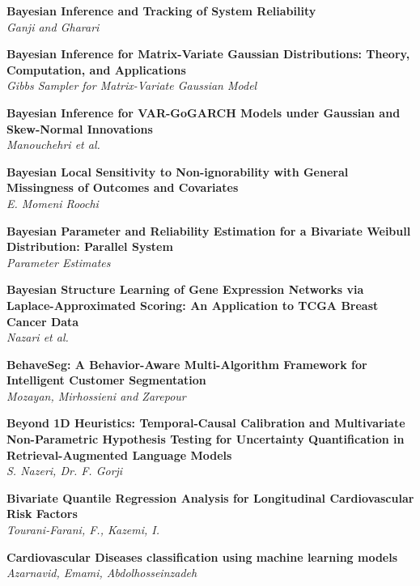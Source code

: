 \noindent
{\bf
Bayesian Inference and Tracking of System Reliability
}\dotfill \pageref{p.1119}\\
{\small \it
Ganji and Gharari
}


\noindent
{\bf
Bayesian Inference for Matrix-Variate Gaussian Distributions: Theory, Computation, and Applications
}\dotfill \pageref{p.1068}\\
{\small \it
Gibbs Sampler for Matrix-Variate Gaussian Model
}


\noindent
{\bf
Bayesian Inference for VAR-GoGARCH Models under Gaussian and Skew-Normal Innovations
}\dotfill \pageref{p.1339}\\
{\small \it
Manouchehri et al.
}


\noindent
{\bf
Bayesian Local Sensitivity to Non-ignorability with General Missingness of Outcomes and Covariates
}\dotfill \pageref{p.1161}\\
{\small \it
E. Momeni Roochi
}


\noindent
{\bf
Bayesian Parameter and Reliability Estimation for a Bivariate Weibull Distribution: Parallel System
}\dotfill \pageref{p.1118}\\
{\small \it
Parameter Estimates
}


\noindent
{\bf
Bayesian Structure Learning of Gene Expression Networks via Laplace-Approximated Scoring: An Application to TCGA Breast Cancer Data
}\dotfill \pageref{p.1311}\\
{\small \it
Nazari et al.
}


\noindent
{\bf
BehaveSeg: A Behavior-Aware Multi-Algorithm Framework for Intelligent Customer Segmentation
}\dotfill \pageref{p.1214}\\
{\small \it
Mozayan, Mirhossieni and Zarepour
}


\noindent
{\bf
Beyond 1D Heuristics: Temporal-Causal Calibration and Multivariate Non-Parametric Hypothesis Testing for Uncertainty Quantification in Retrieval-Augmented Language Models
}\dotfill \pageref{p.1239}\\
{\small \it
S. Nazeri, Dr. F. Gorji
}


\noindent
{\bf
Bivariate Quantile Regression Analysis for Longitudinal Cardiovascular Risk Factors
}\dotfill \pageref{p.1034}\\
{\small \it
Tourani-Farani, F., Kazemi, I.
}


\noindent
{\bf
Cardiovascular Diseases classification using machine learning models
}\dotfill \pageref{p.1318}\\
{\small \it
Azarnavid, Emami, Abdolhosseinzadeh
}


